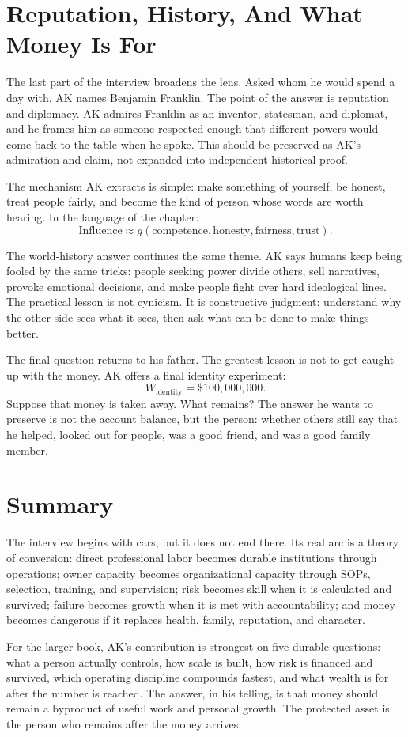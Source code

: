 \section{Reputation, History, And What Money Is For}

The last part of the interview broadens the lens. Asked whom he would spend a day with, AK names Benjamin Franklin. The point of the answer is reputation and diplomacy. AK admires Franklin as an inventor, statesman, and diplomat, and he frames him as someone respected enough that different powers would come back to the table when he spoke. This should be preserved as AK's admiration and claim, not expanded into independent historical proof.

The mechanism AK extracts is simple: make something of yourself, be honest, treat people fairly, and become the kind of person whose words are worth hearing. In the language of the chapter:
\begin{equation}
\mathrm{Influence}
\approx
g(\mathrm{competence},\mathrm{honesty},\mathrm{fairness},\mathrm{trust}).
\end{equation}

The world-history answer continues the same theme. AK says humans keep being fooled by the same tricks: people seeking power divide others, sell narratives, provoke emotional decisions, and make people fight over hard ideological lines. The practical lesson is not cynicism. It is constructive judgment: understand why the other side sees what it sees, then ask what can be done to make things better.

The final question returns to his father. The greatest lesson is not to get caught up with the money. AK offers a final identity experiment:
\begin{equation}
W_{\mathrm{identity}}=\$100{,}000{,}000.
\end{equation}
Suppose that money is taken away. What remains? The answer he wants to preserve is not the account balance, but the person: whether others still say that he helped, looked out for people, was a good friend, and was a good family member.

\section{Summary}

The interview begins with cars, but it does not end there. Its real arc is a theory of conversion: direct professional labor becomes durable institutions through operations; owner capacity becomes organizational capacity through SOPs, selection, training, and supervision; risk becomes skill when it is calculated and survived; failure becomes growth when it is met with accountability; and money becomes dangerous if it replaces health, family, reputation, and character.

For the larger book, AK's contribution is strongest on five durable questions: what a person actually controls, how scale is built, how risk is financed and survived, which operating discipline compounds fastest, and what wealth is for after the number is reached. The answer, in his telling, is that money should remain a byproduct of useful work and personal growth. The protected asset is the person who remains after the money arrives.